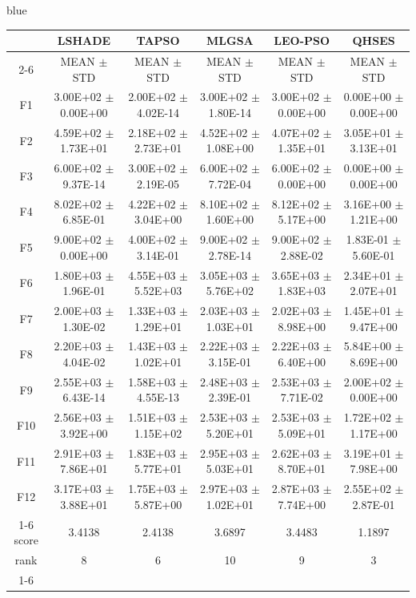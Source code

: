 \documentclass[journal, onecolumn]{IEEEtran}
\begin{document}
\begin{color}{blue}
\begin{table}[htbp!]
\begin{tabular}{c|ccccc}
	&	LSHADE			 &	TAPSO				 &	MLGSA				 &	LEO-PSO				 &	QHSES			\\\cline{2-6}	
	&	MEAN	$\pm$	STD	 &	MEAN	$\pm$	STD		 &	MEAN	$\pm$	STD		 &	MEAN	$\pm$	STD		 &	MEAN	$\pm$	STD	\\	\hline
	F1	 &	3.00E+02	$\pm$	0.00E+00	 &	2.00E+02	$\pm$	4.02E-14		 &	3.00E+02	$\pm$	1.80E-14		 &	3.00E+02	$\pm$	0.00E+00		 &	0.00E+00	$\pm$	0.00E+00	\\	
	F2	 &	4.59E+02	$\pm$	1.73E+01	 &	2.18E+02	$\pm$	2.73E+01		 &	4.52E+02	$\pm$	1.08E+00		 &	4.07E+02	$\pm$	1.35E+01		 &	3.05E+01	$\pm$	3.13E+01	\\	
	F3	 &	6.00E+02	$\pm$	9.37E-14	 &	3.00E+02	$\pm$	2.19E-05		 &	6.00E+02	$\pm$	7.72E-04		 &	6.00E+02	$\pm$	0.00E+00		 &	0.00E+00	$\pm$	0.00E+00	\\	
	F4	 &	8.02E+02	$\pm$	6.85E-01	 &	4.22E+02	$\pm$	3.04E+00		 &	8.10E+02	$\pm$	1.60E+00		 &	8.12E+02	$\pm$	5.17E+00		 &	3.16E+00	$\pm$	1.21E+00	\\	
	F5	 &	9.00E+02	$\pm$	0.00E+00	 &	4.00E+02	$\pm$	3.14E-01		 &	9.00E+02	$\pm$	2.78E-14		 &	9.00E+02	$\pm$	2.88E-02		 &	1.83E-01	$\pm$	5.60E-01	\\	
	F6	 &	1.80E+03	$\pm$	1.96E-01	 &	4.55E+03	$\pm$	5.52E+03		 &	3.05E+03	$\pm$	5.76E+02		 &	3.65E+03	$\pm$	1.83E+03		 &	2.34E+01	$\pm$	2.07E+01	\\	
	F7	 &	2.00E+03	$\pm$	1.30E-02	 &	1.33E+03	$\pm$	1.29E+01		 &	2.03E+03	$\pm$	1.03E+01		 &	2.02E+03	$\pm$	8.98E+00		 &	1.45E+01	$\pm$	9.47E+00	\\	
	F8	 &	2.20E+03	$\pm$	4.04E-02	 &	1.43E+03	$\pm$	1.02E+01		 &	2.22E+03	$\pm$	3.15E-01		 &	2.22E+03	$\pm$	6.40E+00		 &	5.84E+00	$\pm$	8.69E+00	\\	
	F9	 &	2.55E+03	$\pm$	6.43E-14	 &	1.58E+03	$\pm$	4.55E-13		 &	2.48E+03	$\pm$	2.39E-01		 &	2.53E+03	$\pm$	7.71E-02		 &	2.00E+02	$\pm$	0.00E+00	\\	
	F10	 &	2.56E+03	$\pm$	3.92E+00	 &	1.51E+03	$\pm$	1.15E+02		 &	2.53E+03	$\pm$	5.20E+01		 &	2.53E+03	$\pm$	5.09E+01		 &	1.72E+02	$\pm$	1.17E+00	\\	
	F11	 &	2.91E+03	$\pm$	7.86E+01	 &	1.83E+03	$\pm$	5.77E+01		 &	2.95E+03	$\pm$	5.03E+01		 &	2.62E+03	$\pm$	8.70E+01		 &	3.19E+01	$\pm$	7.98E+00	\\	
	F12	 &	3.17E+03	$\pm$	3.88E+01	 &	1.75E+03	$\pm$	5.87E+00		 &	2.97E+03	$\pm$	1.02E+01		 &	2.87E+03	$\pm$	7.74E+00		 &	2.55E+02	$\pm$	2.87E-01	\\	\cline{1-6}
	score	 	& 3.4138 & 2.4138 & 3.6897 & 3.4483 & 1.1897											\\												
	rank 		& 8 & 6 & 10 & 9 & 3											\\	\cline{1-6}											

	\end{tabular}
\end{table}
\end{color}
\end{document}
